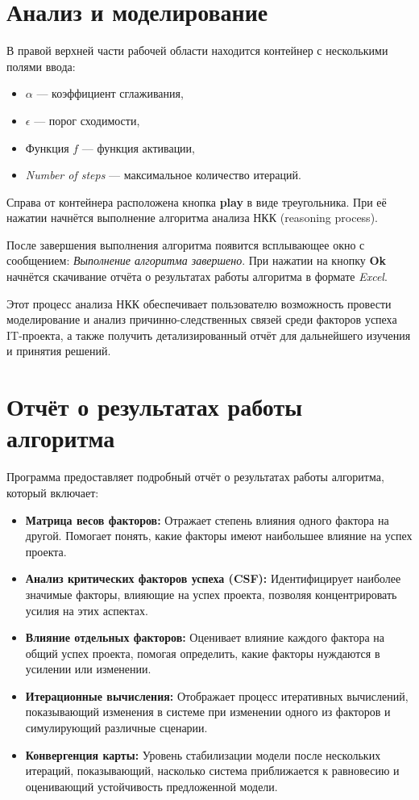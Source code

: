 \documentclass{article}
\begin{document}
    \section{Анализ и моделирование}

    В правой верхней части рабочей области находится контейнер с несколькими полями ввода:
    \begin{itemize}
        \item $\alpha$ — коэффициент сглаживания,
        \item $\epsilon$ — порог сходимости,
        \item Функция $f$ — функция активации,
        \item \textit{Number of steps} — максимальное количество итераций.
    \end{itemize}

    Справа от контейнера расположена кнопка \textbf{play} в виде треугольника. При её нажатии начнётся выполнение алгоритма анализа НКК (reasoning process).

    После завершения выполнения алгоритма появится всплывающее окно с сообщением: \textit{Выполнение алгоритма завершено}. При нажатии на кнопку \textbf{Ok} начнётся скачивание отчёта о результатах работы алгоритма в формате \textit{Excel}.

    Этот процесс анализа НКК обеспечивает пользователю возможность провести моделирование и анализ причинно-следственных связей среди факторов успеха IT-проекта, а также получить детализированный отчёт для дальнейшего изучения и принятия решений.
    \section{Отчёт о результатах работы алгоритма}

    Программа предоставляет подробный отчёт о результатах работы алгоритма, который включает:
    \begin{itemize}
        \item \textbf{Матрица весов факторов:} Отражает степень влияния одного фактора на другой. Помогает понять, какие факторы имеют наибольшее влияние на успех проекта.
        \item \textbf{Анализ критических факторов успеха (CSF):} Идентифицирует наиболее значимые факторы, влияющие на успех проекта, позволяя концентрировать усилия на этих аспектах.
        \item \textbf{Влияние отдельных факторов:} Оценивает влияние каждого фактора на общий успех проекта, помогая определить, какие факторы нуждаются в усилении или изменении.
        \item \textbf{Итерационные вычисления:} Отображает процесс итеративных вычислений, показывающий изменения в системе при изменении одного из факторов и симулирующий различные сценарии.
        \item \textbf{Конвергенция карты:} Уровень стабилизации модели после нескольких итераций, показывающий, насколько система приближается к равновесию и оценивающий устойчивость предложенной модели.
    \end{itemize}
\end{document}
